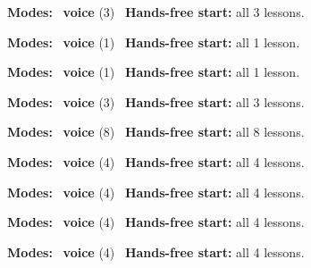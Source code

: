 \expandafter\def\csname hlchaptermodality33\endcsname{%
  {\small\noindent
    \textbf{Modes:} \hlvoicesign{}~\textbf{voice} (3)\quad
    \hlvoicesign{}~\textbf{Hands-free start:} all 3 lessons.%
    \par}\medskip
}

\expandafter\def\csname hlchaptermodality34\endcsname{%
  {\small\noindent
    \textbf{Modes:} \hlvoicesign{}~\textbf{voice} (1)\quad
    \hlvoicesign{}~\textbf{Hands-free start:} all 1 lesson.%
    \par}\medskip
}

\expandafter\def\csname hlchaptermodality35\endcsname{%
  {\small\noindent
    \textbf{Modes:} \hlvoicesign{}~\textbf{voice} (1)\quad
    \hlvoicesign{}~\textbf{Hands-free start:} all 1 lesson.%
    \par}\medskip
}

\expandafter\def\csname hlchaptermodality36\endcsname{%
  {\small\noindent
    \textbf{Modes:} \hlvoicesign{}~\textbf{voice} (3)\quad
    \hlvoicesign{}~\textbf{Hands-free start:} all 3 lessons.%
    \par}\medskip
}

\expandafter\def\csname hlchaptermodality37\endcsname{%
  {\small\noindent
    \textbf{Modes:} \hlvoicesign{}~\textbf{voice} (8)\quad
    \hlvoicesign{}~\textbf{Hands-free start:} all 8 lessons.%
    \par}\medskip
}

\expandafter\def\csname hlchaptermodality38\endcsname{%
  {\small\noindent
    \textbf{Modes:} \hlvoicesign{}~\textbf{voice} (4)\quad
    \hlvoicesign{}~\textbf{Hands-free start:} all 4 lessons.%
    \par}\medskip
}

\expandafter\def\csname hlchaptermodality39\endcsname{%
  {\small\noindent
    \textbf{Modes:} \hlvoicesign{}~\textbf{voice} (4)\quad
    \hlvoicesign{}~\textbf{Hands-free start:} all 4 lessons.%
    \par}\medskip
}

\expandafter\def\csname hlchaptermodality40\endcsname{%
  {\small\noindent
    \textbf{Modes:} \hlvoicesign{}~\textbf{voice} (4)\quad
    \hlvoicesign{}~\textbf{Hands-free start:} all 4 lessons.%
    \par}\medskip
}

\expandafter\def\csname hlchaptermodality41\endcsname{%
  {\small\noindent
    \textbf{Modes:} \hlvoicesign{}~\textbf{voice} (4)\quad
    \hlvoicesign{}~\textbf{Hands-free start:} all 4 lessons.%
    \par}\medskip
}

